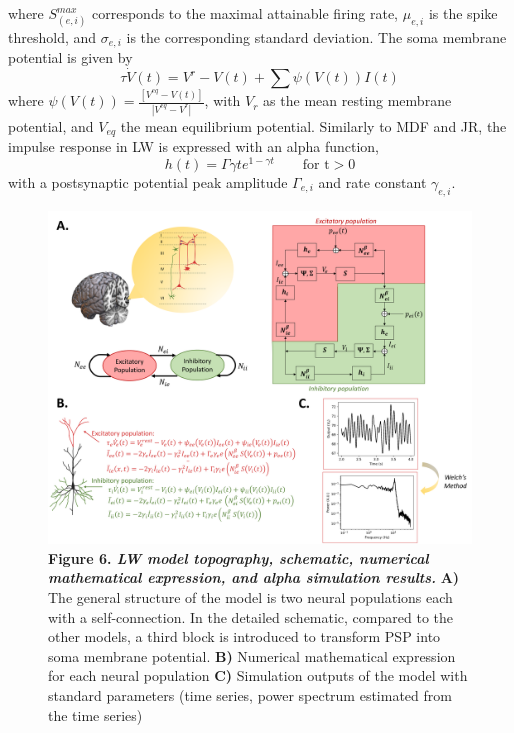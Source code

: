 \documentclass[12pt,twoside]{article}
\begin{document}
where $S_{(e,i)}^{max}$ corresponds to the maximal attainable firing rate, $\mu_{e,i}$ is the spike threshold, and $\sigma_{e,i}$ is the corresponding standard deviation. The soma membrane potential is given by 
\begin{equation}
    \tau \dot{V}(t)=V^r-V(t)+\sum \psi(V(t))I(t)
\end{equation}
where $\psi(V(t))=\frac{[V^{eq}-V(t)]}{|V^{eq}-V^r|} $, with $V_{r}$ as the mean resting membrane potential, and $V_{eq}$ the mean equilibrium potential. Similarly to MDF and JR, the impulse response in LW is expressed with an alpha function,
\begin{equation}
    h(t)=\Gamma \gamma te^{1-\gamma t}  \qquad  \text{for t} >  0
\end{equation}
with a postsynaptic potential peak amplitude $\Gamma_{e,i}$ and rate constant $\gamma_{e,i}$.

\begin{figure}[H]
    \centering
    \includegraphics[scale=0.35]{Images/Liley_schematic_short.png}
    \caption*{\textbf{Figure 6. \textit{LW model  topography, schematic, numerical mathematical expression, and alpha simulation results.}} \textbf{A)} The general structure of the model is two neural populations each with a self-connection. In the detailed schematic, compared to the other models, a third block is introduced to transform PSP into soma membrane potential. \textbf{B)} Numerical mathematical expression for each neural population \textbf{C)} Simulation outputs of the model with standard parameters (time series, power spectrum estimated from the time series)
    }        
    \label{fig:Lil_topography}
\end{figure}
\end{document}
